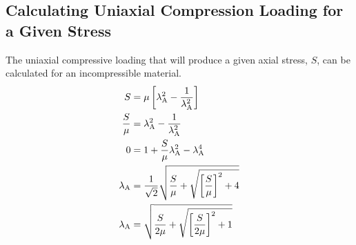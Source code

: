 \documentclass[10pt,letterpaper,oneside]{report}
\newcommand{\scas}[1]{\mbox{{\scriptsize{${\rm{#1}}$}}}{}}
\begin{document}
\begin{itemize}
\subsection{Calculating Uniaxial Compression Loading for a Given Stress}
The uniaxial compressive loading that will produce a given axial stress, $S$, can be calculated for an incompressible material.
\begin{align}
S &= \mu \left[ \lambda_{\scas{A}}^2 - \frac{1}{\lambda_{\scas{A}}^2 } \right] \\
\frac{S}{\mu} &= \lambda_{\scas{A}}^2 - \frac{1}{\lambda_{\scas{A}}^2 } \\
0 &= 1 + \frac{S}{\mu} \lambda_{\scas{A}}^2 - \lambda_{\scas{A}}^4 \\
\lambda_{\scas{A}} &= \frac{1}{\sqrt{2}} \sqrt{ \frac{S}{\mu} + \sqrt{ \left[ \frac{S}{\mu} \right]^2 + 4 } } \\
\lambda_{\scas{A}} &= \sqrt{ \frac{S}{2 \mu} + \sqrt{ \left[ \frac{S}{ 2 \mu} \right] ^2 + 1 } } 
\end{align}




\end{itemize}
\end{document}
